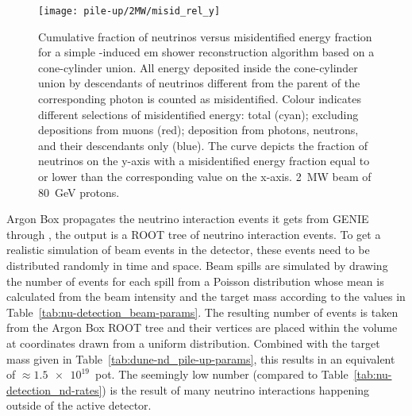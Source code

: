 \begin{figure}[htb]
	\centering
	\texttt{[image: pile-up/2MW/misid\_rel\_y]}
	\caption[Pile-up study neutrino vs.\ misidentified energy fraction, \SI{2}{\mega\watt} beam]{%
		Cumulative fraction of neutrinos versus misidentified energy fraction for a simple \Pgpz-induced \acrshort{em} shower reconstruction algorithm based on a cone-cylinder union.
		All energy deposited inside the cone-cylinder union by descendants of neutrinos different from the parent of the corresponding \Pgpz photon is counted as misidentified.
		Colour indicates different selections of misidentified energy: total (cyan); excluding depositions from muons (red); deposition from photons, neutrons, and their descendants only (blue).
		The curve depicts the fraction of neutrinos on the y-axis with a misidentified energy fraction equal to or lower than the corresponding value on the x-axis.
		\SI{2}{\mega\watt} beam of \SI{80}{\giga\electronvolt} protons.
	}
	\label{fig:dune-nd_2MW_misid-rel-y}
\end{figure}

Argon Box propagates the neutrino interaction events it gets from GENIE through \lar{}, the output is a ROOT tree of neutrino interaction events.
To get a realistic simulation of beam events in the detector, these events need to be distributed randomly in time and space.
Beam spills are simulated by drawing the number of events for each spill from a Poisson distribution whose mean is calculated from the beam intensity and the target mass according to the values in Table~\ref{tab:nu-detection_beam-params}.
The resulting number of events is taken from the Argon Box ROOT tree and their vertices are placed within the \lar{} volume at coordinates drawn from a uniform distribution.
Combined with the target mass given in Table~\ref{tab:dune-nd_pile-up-params}, this results in an equivalent of $\approx \num{1.5e19}$~\gls{pot}.
The seemingly low number (compared to Table~\ref{tab:nu-detection_nd-rates}) is the result of many neutrino interactions happening outside of the active detector.

